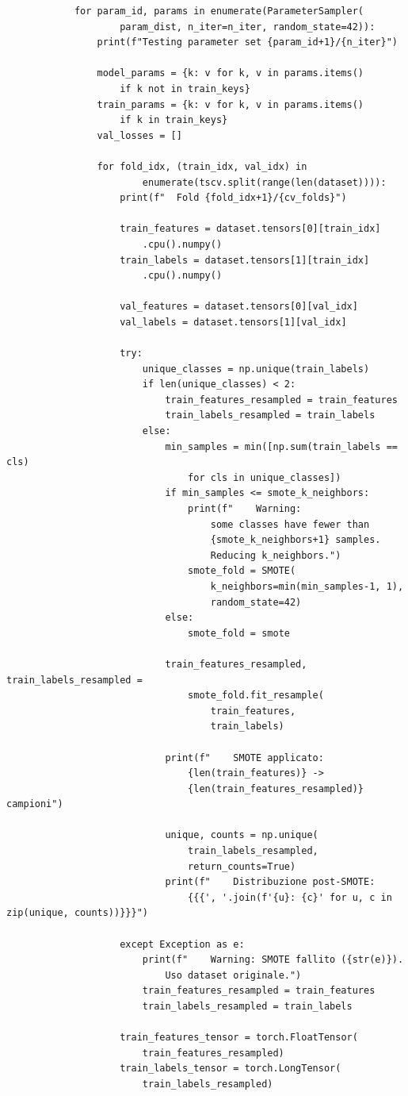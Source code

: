 \documentclass[a4paper,12pt]{report}
\begin{document}
\begin{verbatim}
			for param_id, params in enumerate(ParameterSampler(
					param_dist, n_iter=n_iter, random_state=42)):
				print(f"Testing parameter set {param_id+1}/{n_iter}")
			
				model_params = {k: v for k, v in params.items() 
					if k not in train_keys}
				train_params = {k: v for k, v in params.items() 
					if k in train_keys}
				val_losses = []
				
				for fold_idx, (train_idx, val_idx) in 
						enumerate(tscv.split(range(len(dataset)))):
					print(f"  Fold {fold_idx+1}/{cv_folds}")
					
					train_features = dataset.tensors[0][train_idx]
						.cpu().numpy()
					train_labels = dataset.tensors[1][train_idx]
						.cpu().numpy()
					
					val_features = dataset.tensors[0][val_idx]
					val_labels = dataset.tensors[1][val_idx]
					
					try:
						unique_classes = np.unique(train_labels)
						if len(unique_classes) < 2:
							train_features_resampled = train_features
							train_labels_resampled = train_labels
						else:
							min_samples = min([np.sum(train_labels == cls) 
								for cls in unique_classes])
							if min_samples <= smote_k_neighbors:
								print(f"    Warning: 
									some classes have fewer than 
									{smote_k_neighbors+1} samples. 
									Reducing k_neighbors.")
								smote_fold = SMOTE(
									k_neighbors=min(min_samples-1, 1), 
									random_state=42)
							else:
								smote_fold = smote
						
							train_features_resampled, train_labels_resampled = 
								smote_fold.fit_resample(
									train_features, 
									train_labels)
							
							print(f"    SMOTE applicato: 
								{len(train_features)} -> 
								{len(train_features_resampled)} campioni")
							
							unique, counts = np.unique(
								train_labels_resampled, 
								return_counts=True)
							print(f"    Distribuzione post-SMOTE: 
								{{{', '.join(f'{u}: {c}' for u, c in zip(unique, counts))}}}")
					
					except Exception as e:
						print(f"    Warning: SMOTE fallito ({str(e)}). 
							Uso dataset originale.")
						train_features_resampled = train_features
						train_labels_resampled = train_labels
					
					train_features_tensor = torch.FloatTensor(
						train_features_resampled)
					train_labels_tensor = torch.LongTensor(
						train_labels_resampled)
					

\end{verbatim}
\end{document}
